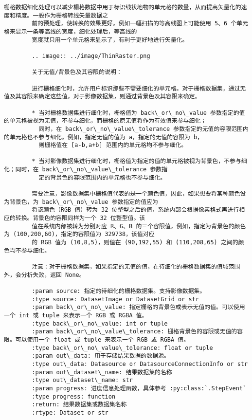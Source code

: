\documentclass[11pt]{article}
\begin{document}
\begin{Verbatim}[commandchars=\\\{\}]
        栅格数据细化处理可以减少栅格数据中用于标识线状地物的单元格的数量，从而提高矢量化的速度和精度。一般作为栅格转线矢量数据之
        前的预处理，使转换的效果更好。例如一幅扫描的等高线图上可能使用 5、6 个单元格来显示一条等高线的宽度，细化处理后，等高线的
        宽度就只用一个单元格来显示了，有利于更好地进行矢量化。
        
        .. image:: ../image/ThinRaster.png
        
        关于无值/背景色及其容限的说明：
        
        进行栅格细化时，允许用户标识那些不需要细化的单元格。对于栅格数据集，通过无值及其容限来确定这些值，对于影像数据集，则通过背景色及其容限来确定。
        
        * 当对栅格数据集进行细化时，栅格值为 back\_or\_no\_value 参数指定的值的单元格被视为无值，不参与细化，而栅格的原无值将作为有效值来参与细化；
          同时，在 back\_or\_no\_value\_tolerance 参数指定的无值的容限范围内的单元格也不参与细化。例如，指定无值的值为 a，指定的无值的容限为 b，
          则栅格值在 [a-b,a+b] 范围内的单元格均不参与细化。
        
        * 当对影像数据集进行细化时，栅格值为指定的值的单元格被视为背景色，不参与细化；同时，在 back\_or\_no\_value\_tolerance 参数指
          定的背景色的容限范围内的单元格也不参与细化。
        
        需要注意，影像数据集中栅格值代表的是一个颜色值，因此，如果想要将某种颜色设为背景色，为 back\_or\_no\_value 参数指定的值应为
        将该颜色（RGB 值）转为 32 位整型之后的值，系统内部会根据像素格式再进行相应的转换。背景色的容限同样为一个 32 位整型值。该
        值在系统内部被转为分别对应 R、G、B 的三个容限值，例如，指定为背景色的颜色为 (100,200,60)，指定的容限值为 329738，该值对应
        的 RGB 值为 (10,8,5)，则值在 (90,192,55) 和 (110,208,65) 之间的颜色均不参与细化。
        
        注意：对于栅格数据集，如果指定的无值的值，在待细化的栅格数据集的值域范围外，会分析失败，返回 None。
        
        :param source: 指定的待细化的栅格数据集。支持影像数据集。
        :type source: DatasetImage or DatasetGrid or str
        :param back\_or\_no\_value: 指定栅格的背景色或表示无值的值。可以使用一个 int 或 tuple 来表示一个 RGB 或 RGBA 值。
        :type back\_or\_no\_value: int or tuple
        :param back\_or\_no\_value\_tolerance: 栅格背景色的容限或无值的容限。可以使用一个 float 或 tuple 来表示一个 RGB 或 RGBA 值。
        :type back\_or\_no\_value\_tolerance: float or tuple
        :param out\_data: 用于存储结果数据的数据源。
        :type out\_data: Datasource or DatasourceConnectionInfo or str
        :param out\_dataset\_name: 结果数据集的名称
        :type out\_dataset\_name: str
        :param progress: 进度信息处理函数，具体参考 :py:class:`.StepEvent`
        :type progress: function
        :return: 结果数据集或数据集名称
        :rtype: Dataset or str
    

\end{Verbatim}
\end{document}

